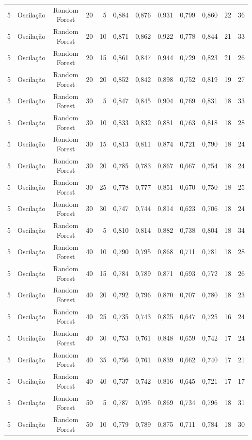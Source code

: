 \begin{longtable}{ccclrrrrrrrr}
5 & Oscilação & Random Forest & 20 & 5 & 0,884 & 0,876 & 0,931 & 0,799 & 0,860 & 22 & 36 \\
5 & Oscilação & Random Forest & 20 & 10 & 0,871 & 0,862 & 0,922 & 0,778 & 0,844 & 21 & 33 \\
5 & Oscilação & Random Forest & 20 & 15 & 0,861 & 0,847 & 0,944 & 0,729 & 0,823 & 21 & 26 \\
5 & Oscilação & Random Forest & 20 & 20 & 0,852 & 0,842 & 0,898 & 0,752 & 0,819 & 19 & 27 \\
5 & Oscilação & Random Forest & 30 & 5 & 0,847 & 0,845 & 0,904 & 0,769 & 0,831 & 18 & 33 \\
5 & Oscilação & Random Forest & 30 & 10 & 0,833 & 0,832 & 0,881 & 0,763 & 0,818 & 18 & 28 \\
5 & Oscilação & Random Forest & 30 & 15 & 0,813 & 0,811 & 0,874 & 0,721 & 0,790 & 18 & 24 \\
5 & Oscilação & Random Forest & 30 & 20 & 0,785 & 0,783 & 0,867 & 0,667 & 0,754 & 18 & 24 \\
5 & Oscilação & Random Forest & 30 & 25 & 0,778 & 0,777 & 0,851 & 0,670 & 0,750 & 18 & 25 \\
5 & Oscilação & Random Forest & 30 & 30 & 0,747 & 0,744 & 0,814 & 0,623 & 0,706 & 18 & 24 \\
5 & Oscilação & Random Forest & 40 & 5 & 0,810 & 0,814 & 0,882 & 0,738 & 0,804 & 18 & 34 \\
5 & Oscilação & Random Forest & 40 & 10 & 0,790 & 0,795 & 0,868 & 0,711 & 0,781 & 18 & 28 \\
5 & Oscilação & Random Forest & 40 & 15 & 0,784 & 0,789 & 0,871 & 0,693 & 0,772 & 18 & 26 \\
5 & Oscilação & Random Forest & 40 & 20 & 0,792 & 0,796 & 0,870 & 0,707 & 0,780 & 18 & 23 \\
5 & Oscilação & Random Forest & 40 & 25 & 0,735 & 0,743 & 0,825 & 0,647 & 0,725 & 16 & 24 \\
5 & Oscilação & Random Forest & 40 & 30 & 0,753 & 0,761 & 0,848 & 0,659 & 0,742 & 17 & 24 \\
5 & Oscilação & Random Forest & 40 & 35 & 0,756 & 0,761 & 0,839 & 0,662 & 0,740 & 17 & 21 \\
5 & Oscilação & Random Forest & 40 & 40 & 0,737 & 0,742 & 0,816 & 0,645 & 0,721 & 17 & 17 \\
5 & Oscilação & Random Forest & 50 & 5 & 0,787 & 0,795 & 0,869 & 0,734 & 0,796 & 18 & 31 \\
5 & Oscilação & Random Forest & 50 & 10 & 0,779 & 0,789 & 0,875 & 0,711 & 0,784 & 18 & 30 \\

\end{longtable}
